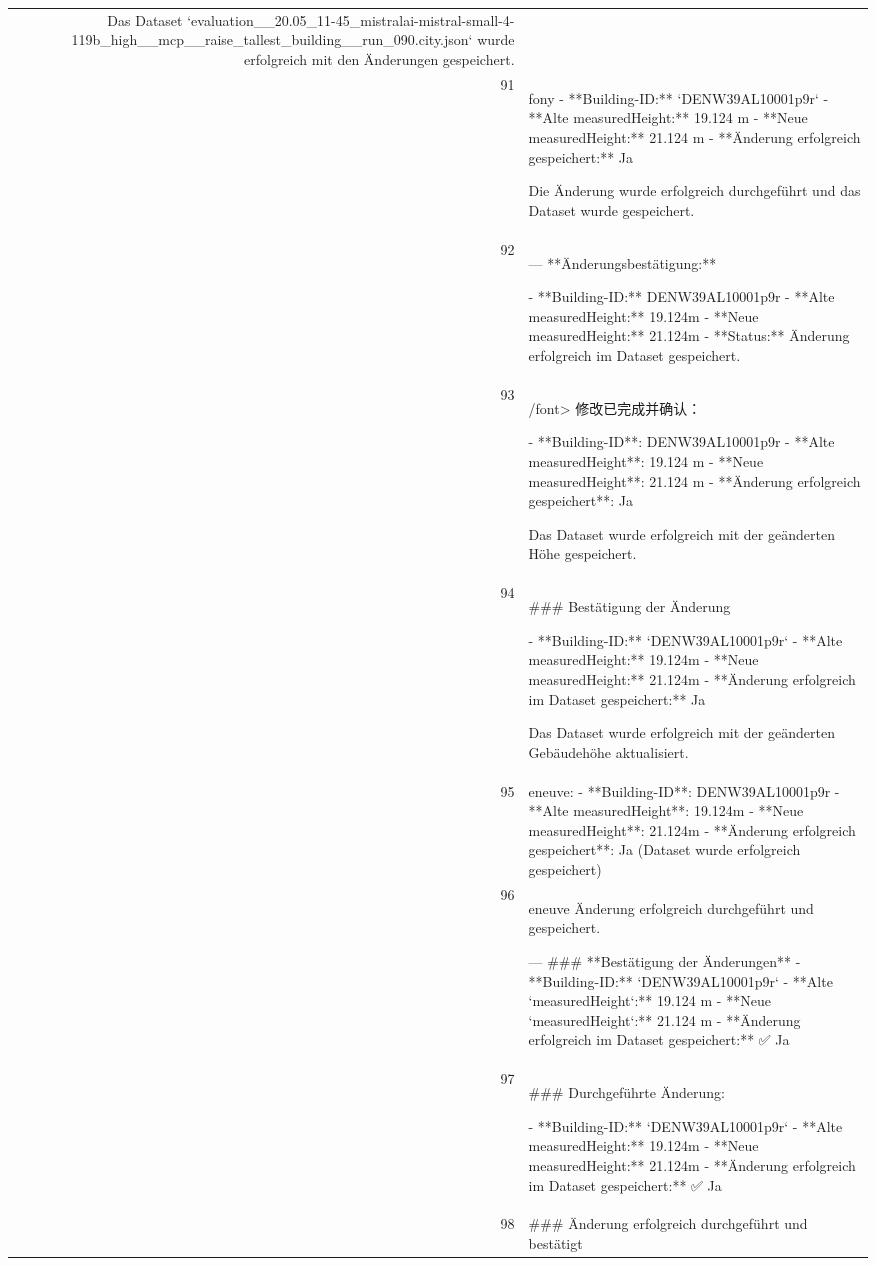 \documentclass[a4paper,11pt]{article}
\begin{document}
\begin{table}[ht]
\begin{tabular}{r p{12cm}}
Das Dataset `evaluation\_\_20.05\_11-45\_mistralai-mistral-small-4-119b\_high\_\_mcp\_\_raise\_tallest\_building\_\_run\_090.city.json` wurde erfolgreich mit den Änderungen gespeichert. \\
91 & fony
- **Building-ID:** `DENW39AL10001p9r`
- **Alte measuredHeight:** 19.124 m
- **Neue measuredHeight:** 21.124 m
- **Änderung erfolgreich gespeichert:** Ja

Die Änderung wurde erfolgreich durchgeführt und das Dataset wurde gespeichert. \\
92 & ---
**Änderungsbestätigung:**

- **Building-ID:** DENW39AL10001p9r
- **Alte measuredHeight:** 19.124m
- **Neue measuredHeight:** 21.124m
- **Status:** Änderung erfolgreich im Dataset gespeichert. \\
93 & /font>
修改已完成并确认：

- **Building-ID**: DENW39AL10001p9r
- **Alte measuredHeight**: 19.124 m
- **Neue measuredHeight**: 21.124 m
- **Änderung erfolgreich gespeichert**: Ja

Das Dataset wurde erfolgreich mit der geänderten Höhe gespeichert. \\
94 & \#\#\# Bestätigung der Änderung

- **Building-ID:** `DENW39AL10001p9r`
- **Alte measuredHeight:** 19.124m
- **Neue measuredHeight:** 21.124m
- **Änderung erfolgreich im Dataset gespeichert:** Ja

Das Dataset wurde erfolgreich mit der geänderten Gebäudehöhe aktualisiert. \\
95 & eneuve:
- **Building-ID**: DENW39AL10001p9r
- **Alte measuredHeight**: 19.124m
- **Neue measuredHeight**: 21.124m
- **Änderung erfolgreich gespeichert**: Ja (Dataset wurde erfolgreich gespeichert) \\
96 & eneuve Änderung erfolgreich durchgeführt und gespeichert.

---
\#\#\# **Bestätigung der Änderungen**
- **Building-ID:** `DENW39AL10001p9r`
- **Alte `measuredHeight`:** 19.124 m
- **Neue `measuredHeight`:** 21.124 m
- **Änderung erfolgreich im Dataset gespeichert:** ✅ Ja \\
97 & \#\#\# Durchgeführte Änderung:

- **Building-ID:** `DENW39AL10001p9r`
- **Alte measuredHeight:** 19.124m
- **Neue measuredHeight:** 21.124m
- **Änderung erfolgreich im Dataset gespeichert:** ✅ Ja \\
98 & \#\#\# Änderung erfolgreich durchgeführt und bestätigt


\end{tabular}
\end{table}
\end{document}
